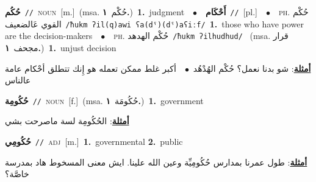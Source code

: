 \documentclass[10pt,a4paper,twoside]{article} %
\begin{document}
\begin{multicols}{2}
{\setlength\topsep{0pt}\textbf{\foreignlanguage{arabic}{حُكُم}}\ {\color{gray}\texttt{//}\color{black}}\ \textsc{noun}\ [m.]\ \color{gray}(msa. \foreignlanguage{arabic}{حُكْم}~\foreignlanguage{arabic}{\textbf{١.}})\color{black}\ \textbf{1.}~judgment\ \ $\bullet$\ \ \setlength\topsep{0pt}\textbf{\foreignlanguage{arabic}{أَحْكَام}}\ {\color{gray}\texttt{//}\color{black}}\ [pl.]\ \ $\bullet$\ \ \textsc{ph.} \color{gray} \foreignlanguage{arabic}{حُكْم القوي عَالضعيف}\color{black}\ {\color{gray}\texttt{/{\sffamily ħukm ʔil(q)awi ʕa(dˤ)(dˤ)aʕiːf}/}\color{black}}\ \textbf{1.}~those who have power are the decision-makers\ \ $\bullet$\ \ \textsc{ph.} \color{gray} \foreignlanguage{arabic}{حُكْم الهدهد}\color{black}\ {\color{gray}\texttt{/{\sffamily ħukm ʔilhudhud}/}\color{black}}\ \color{gray} (msa. \foreignlanguage{arabic}{قرار مجحف}~\foreignlanguage{arabic}{\textbf{١.}})\color{black}\ \textbf{1.}~unjust decision\  \begin{flushright}\color{gray}\foreignlanguage{arabic}{\textbf{\underline{\foreignlanguage{arabic}{أمثلة}}}: شو بدنا نعمل؟ حُكْم الهُدْهُد\ $\bullet$\ \  أكبر غلط ممكن تعمله هو إِنك تتطلق أحْكام عامة عالناس}\end{flushright}\color{black}} \vspace{2mm}

{\setlength\topsep{0pt}\textbf{\foreignlanguage{arabic}{حُكُومِة}}\ {\color{gray}\texttt{//}\color{black}}\ \textsc{noun}\ [f.]\ \color{gray}(msa. \foreignlanguage{arabic}{حُكُومَة}~\foreignlanguage{arabic}{\textbf{١.}})\color{black}\ \textbf{1.}~government\  \begin{flushright}\color{gray}\foreignlanguage{arabic}{\textbf{\underline{\foreignlanguage{arabic}{أمثلة}}}: الحُكُومِة لسة ماصرحت بشي}\end{flushright}\color{black}} \vspace{2mm}

{\setlength\topsep{0pt}\textbf{\foreignlanguage{arabic}{حُكُومِي}}\ {\color{gray}\texttt{//}\color{black}}\ \textsc{adj}\ [m.]\ \textbf{1.}~governmental  \textbf{2.}~public\  \begin{flushright}\color{gray}\foreignlanguage{arabic}{\textbf{\underline{\foreignlanguage{arabic}{أمثلة}}}: طول عمرنا بمدارس حُكُومِيِّة وعين الله علينا. ايش معنى المسخوط هاد بمدرسة خاصَّة؟}\end{flushright}\color{black}} \vspace{2mm}


\end{multicols}
\end{document}

